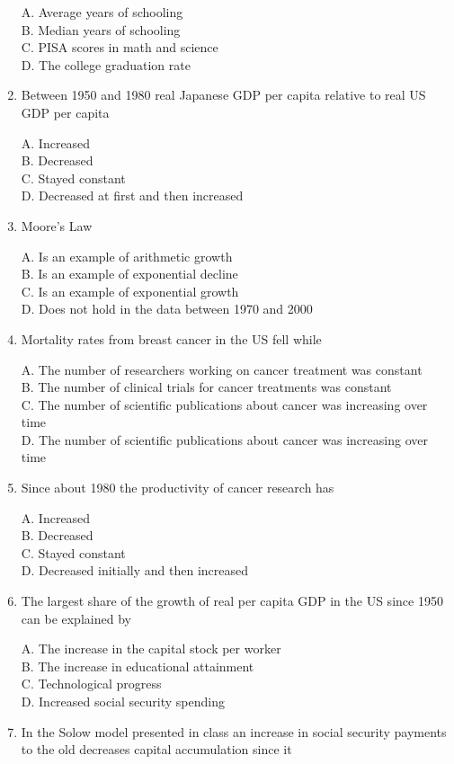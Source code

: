 \documentclass[
]{book}
\begin{document}
\begin{enumerate}
  A. Average years of schooling\\
  B. Median years of schooling\\
  C. PISA scores in math and science\\
  D. The college graduation rate
\item
  Between 1950 and 1980 real Japanese GDP per capita relative to real US GDP per capita

  A. Increased\\
  B. Decreased\\
  C. Stayed constant\\
  D. Decreased at first and then increased
\item
  Moore's Law

  A. Is an example of arithmetic growth\\
  B. Is an example of exponential decline\\
  C. Is an example of exponential growth\\
  D. Does not hold in the data between 1970 and 2000
\item
  Mortality rates from breast cancer in the US fell while

  A. The number of researchers working on cancer treatment was constant\\
  B. The number of clinical trials for cancer treatments was constant\\
  C. The number of scientific publications about cancer was increasing over time\\
  D. The number of scientific publications about cancer was increasing over time
\item
  Since about 1980 the productivity of cancer research has

  A. Increased\\
  B. Decreased\\
  C. Stayed constant\\
  D. Decreased initially and then increased
\item
  The largest share of the growth of real per capita GDP in the US since 1950 can be explained by

  A. The increase in the capital stock per worker\\
  B. The increase in educational attainment\\
  C. Technological progress\\
  D. Increased social security spending
\item
  In the Solow model presented in class an increase in social security payments to the old decreases capital accumulation since it


\end{enumerate}
\end{document}
